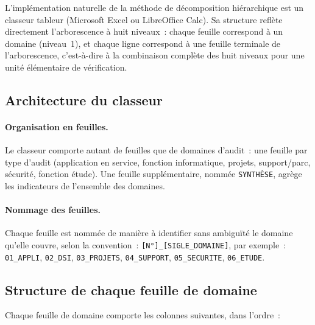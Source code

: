 L'implémentation naturelle de la méthode de décomposition hiérarchique est un
classeur tableur (Microsoft Excel ou LibreOffice Calc). Sa structure reflète
directement l'arborescence à huit niveaux~: chaque feuille correspond à un
domaine (niveau~1), et chaque ligne correspond à une feuille terminale de
l'arborescence, c'est-à-dire à la combinaison complète des huit niveaux pour une
unité élémentaire de vérification.

\subsection{Architecture du classeur}

\paragraph{Organisation en feuilles.}
Le classeur comporte autant de feuilles que de domaines d'audit~: une feuille
par type d'audit (application en service, fonction informatique, projets,
support/parc, sécurité, fonction étude). Une feuille supplémentaire, nommée
\texttt{SYNTHÈSE}, agrège les indicateurs de l'ensemble des domaines.

\paragraph{Nommage des feuilles.}
Chaque feuille est nommée de manière à identifier sans ambiguïté le domaine
qu'elle couvre, selon la convention~: \texttt{[N°]\_[SIGLE\_DOMAINE]}, par
exemple~: \texttt{01\_APPLI}, \texttt{02\_DSI}, \texttt{03\_PROJETS},
\texttt{04\_SUPPORT}, \texttt{05\_SECURITE}, \texttt{06\_ETUDE}.

\subsection{Structure de chaque feuille de domaine}

Chaque feuille de domaine comporte les colonnes suivantes, dans l'ordre~:

